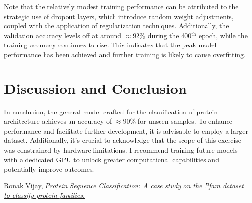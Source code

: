 \documentclass[a4paper,12pt]{article}
\begin{document}
Note that the relatively modest training performance can be attributed to the strategic use of dropout layers, which introduce random weight adjustments, coupled with the application of regularization techniques. Additionally, the validation accuracy levels off at around $\approx92\%$ during the 400$^{\text{th}}$ epoch, while the training accuracy continues to rise. This indicates that the peak model performance has been achieved and further training is likely to cause overfitting. 
\section{Discussion and Conclusion}
\label{sec:conclusion}
In conclusion, the general model crafted for the classification of protein architecture achieves an accuracy of $\approx90\%$ for unseen samples. To enhance performance and facilitate further development, it is advisable to employ a larger dataset. Additionally, it's crucial to acknowledge that the scope of this exercise was constrained by hardware limitations. I recommend training future models with a dedicated GPU to unlock greater computational capabilities and potentially improve outcomes.
\begin{thebibliography}{99}
Ronak Vijay,  \href{https://towardsdatascience.com/protein-sequence-classification-99c80d0ad2df}{\textit{Protein Sequence Classification: A case study on the Pfam dataset to classify protein families.}}
\end{thebibliography}
\end{document}
